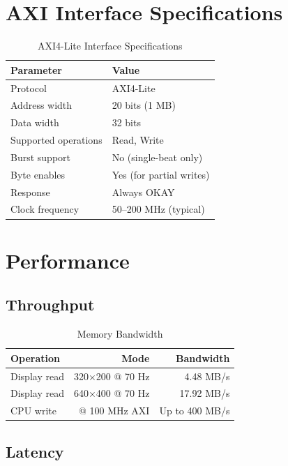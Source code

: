 \documentclass[11pt,letterpaper]{report}
\begin{document}
\section{AXI Interface Specifications}

\begin{table}[tbp]
\centering
\caption{AXI4-Lite Interface Specifications}
\label{tab:axi_specs}
\begin{tabular}{ll}
\toprule
\textbf{Parameter} & \textbf{Value} \\
\midrule
Protocol & AXI4-Lite \\
Address width & 20 bits (1 MB) \\
Data width & 32 bits \\
Supported operations & Read, Write \\
Burst support & No (single-beat only) \\
Byte enables & Yes (for partial writes) \\
Response & Always OKAY \\
Clock frequency & 50--200 MHz (typical) \\
\bottomrule
\end{tabular}
\end{table}

\section{Performance}

\subsection{Throughput}

\begin{table}[tbp]
\centering
\caption{Memory Bandwidth}
\label{tab:mem_bandwidth}
\begin{tabular}{lrr}
\toprule
\textbf{Operation} & \textbf{Mode} & \textbf{Bandwidth} \\
\midrule
Display read & 320$\times$200 @ 70 Hz & 4.48 MB/s \\
Display read & 640$\times$400 @ 70 Hz & 17.92 MB/s \\
CPU write & @ 100 MHz AXI & Up to 400 MB/s \\
\bottomrule
\end{tabular}
\end{table}

\subsection{Latency}
\end{document}
